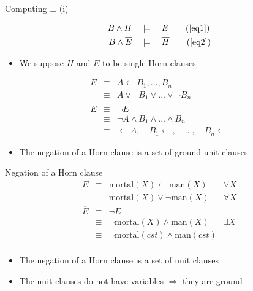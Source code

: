 \begin{frame}{Computing $\bot$ (i)}

\begin{align}
B \land H \quad &\models \quad E \tag{\ref{eq1}} \\
B \land \overline{E} \quad &\models \quad \overline{H} \tag{\ref{eq2}}
\end{align}

\begin{itemize}
    \item We suppose $H$ and $E$ to be single Horn clauses
\end{itemize}

\begin{eqnarray*}
E &\equiv& A \leftarrow B_1, ..., B_n \\
  &\equiv& A \lor \neg B_1 \lor ... \lor \neg B_n \\
\overline{E} &\equiv& \neg E \\
&\equiv& \neg A \land B_1 \land ... \land B_n \\
&\equiv& \leftarrow A, \quad B_1 \leftarrow, \quad ..., \quad B_n \leftarrow 
\end{eqnarray*}    

\begin{itemize}
    \item The negation of a Horn clause is a set of ground unit clauses
\end{itemize}    
    
\end{frame}

\begin{frame}{Negation of a Horn clause}
\vfill
$$\begin{array}{llll}
E &\equiv& \text{mortal}(X) \leftarrow \text{man}(X)   & \forall X \\
&\equiv& \text{mortal}(X) \lor \neg \text{man}(X)  & \forall X\\
\overline{E} &\equiv& \neg E & \\
&\equiv& \neg \text{mortal}(X) \land \text{man}(X) & \exists X\\
&\equiv& \neg \text{mortal}(cst) \land \text{man}(cst) &  \\
\end{array}$$
\vfill
\begin{itemize}
    \item The negation of a Horn clause is a set of unit clauses
    \item The unit clauses do not have variables $\Rightarrow$ they are ground
\end{itemize}
\vfill
\end{frame}



